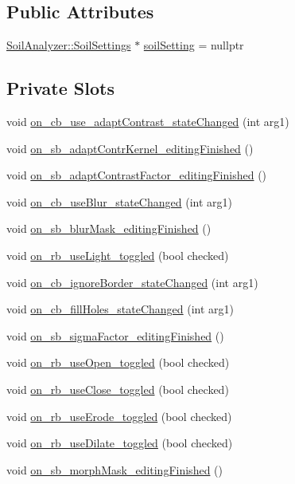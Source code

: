 \subsection*{Public Attributes}
\begin{DoxyCompactItemize}
\item 
\hyperlink{class_soil_analyzer_1_1_soil_settings}{Soil\+Analyzer\+::\+Soil\+Settings} $\ast$ \hyperlink{class_vision_settings_ad2edb496bf1bf72e2f36d23ae2a28b30}{soil\+Setting} = nullptr
\end{DoxyCompactItemize}
\subsection*{Private Slots}
\begin{DoxyCompactItemize}
\item 
void \hyperlink{class_vision_settings_a2f081e5b420566a85c6ec9b416caf166}{on\+\_\+cb\+\_\+use\+\_\+adapt\+Contrast\+\_\+state\+Changed} (int arg1)
\item 
void \hyperlink{class_vision_settings_afde7d0e20c0270f143e2502746369756}{on\+\_\+sb\+\_\+adapt\+Contr\+Kernel\+\_\+editing\+Finished} ()
\item 
void \hyperlink{class_vision_settings_a9de90437bfe73a49384fb80465cb9425}{on\+\_\+sb\+\_\+adapt\+Contrast\+Factor\+\_\+editing\+Finished} ()
\item 
void \hyperlink{class_vision_settings_a1cafa3881f253c872a9c684b0ea2032c}{on\+\_\+cb\+\_\+use\+Blur\+\_\+state\+Changed} (int arg1)
\item 
void \hyperlink{class_vision_settings_a9303cfb27a50bebd4afa962487eff05c}{on\+\_\+sb\+\_\+blur\+Mask\+\_\+editing\+Finished} ()
\item 
void \hyperlink{class_vision_settings_a3c8fda55df2c6f78c414545df38c7758}{on\+\_\+rb\+\_\+use\+Light\+\_\+toggled} (bool checked)
\item 
void \hyperlink{class_vision_settings_abec3ca1bcce3a19d2c83f022871e491b}{on\+\_\+cb\+\_\+ignore\+Border\+\_\+state\+Changed} (int arg1)
\item 
void \hyperlink{class_vision_settings_a7d0cbfc8e2fe0eb29feb658fd537f423}{on\+\_\+cb\+\_\+fill\+Holes\+\_\+state\+Changed} (int arg1)
\item 
void \hyperlink{class_vision_settings_aa88dd41f724a3750ef342a46ddc1bb27}{on\+\_\+sb\+\_\+sigma\+Factor\+\_\+editing\+Finished} ()
\item 
void \hyperlink{class_vision_settings_a74b88a82274ab3e820ff0cae6304cc09}{on\+\_\+rb\+\_\+use\+Open\+\_\+toggled} (bool checked)
\item 
void \hyperlink{class_vision_settings_a26004408ab9f3517f853c101732a5b26}{on\+\_\+rb\+\_\+use\+Close\+\_\+toggled} (bool checked)
\item 
void \hyperlink{class_vision_settings_aa068a104627dbb6eebc50361651fa134}{on\+\_\+rb\+\_\+use\+Erode\+\_\+toggled} (bool checked)
\item 
void \hyperlink{class_vision_settings_a856fe5e3caafa288908d289a4102437f}{on\+\_\+rb\+\_\+use\+Dilate\+\_\+toggled} (bool checked)
\item 
void \hyperlink{class_vision_settings_a9fcdfa080c4c625c7a107168bd70d610}{on\+\_\+sb\+\_\+morph\+Mask\+\_\+editing\+Finished} ()
\end{DoxyCompactItemize}
